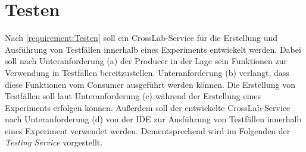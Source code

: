 \section{Testen}\label{section:konzeption:testen}


Nach \autoref{requirement:Testen} soll ein CrossLab-Service für die Erstellung und Ausführung von Testfällen innerhalb eines Experiments entwickelt werden. Dabei soll nach Unteranforderung (a) der Producer in der Lage sein Funktionen zur Verwendung in Testfällen bereitzustellen. Unteranforderung (b) verlangt, dass diese Funktionen vom Consumer ausgeführt werden können. Die Erstellung von Testfällen soll laut Unteranforderung (c) während der Erstellung eines Experiments erfolgen können. Außerdem soll der entwickelte CrossLab-Service nach Unteranforderung (d) von der IDE zur Ausführung von Testfällen innerhalb eines Experiment verwendet werden. Dementsprechend wird im Folgenden der \textit{Testing Service} vorgestellt.

